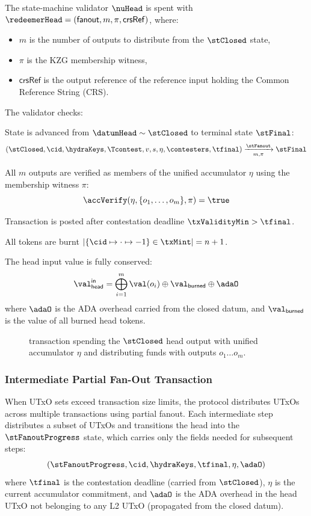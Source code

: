 \noindent The state-machine validator $\nuHead$ is spent with
$\redeemerHead = (\mathsf{fanout}, m, \pi, \mathsf{crsRef})$, where:
\begin{itemize}
  \item $m$ is the number of outputs to distribute from the $\stClosed$ state,
  \item $\pi$ is the KZG membership witness,
  \item $\mathsf{crsRef}$ is the output reference of the reference input holding the Common Reference String (CRS).
\end{itemize}
The validator checks:
\begin{menumerate}
	\item State is advanced from $\datumHead \sim \stClosed$ to terminal state $\stFinal$:
	\[
		(\stClosed,\cid,\hydraKeys,\Tcontest,v, s,\eta,\contesters,\tfinal) \xrightarrow[m,\pi]{\stFanout} \stFinal
	\]
	\item All $m$ outputs are verified as members of the unified accumulator $\eta$ using the membership witness $\pi$:
	\[
		\accVerify(\eta, \{o_1, \ldots, o_m\}, \pi) = \true
	\]
	\item Transaction is posted after contestation deadline $\txValidityMin > \tfinal$.
	\item All tokens are burnt
	$|\{\cid \mapsto \cdot \mapsto -1\} \in \txMint| = n + 1$.
	\item The head input value is fully conserved:
	\[
		\val_{\mathsf{head}}^{\mathsf{in}} = \bigoplus_{i=1}^{m} \val(o_i) \oplus \val_{\mathsf{burned}} \oplus \adaO
	\]
	where $\adaO$ is the ADA overhead carried from the closed datum, and $\val_{\mathsf{burned}}$ is the value of all burned head tokens.
\end{menumerate}

\begin{figure}[H]
	\centering
	
	\caption{\mtxFanout{} transaction spending the $\stClosed$ head output with unified accumulator $\eta$ and
		distributing funds with outputs $o_{1} \dots o_{m}$.}\label{fig:fanoutTx}
\end{figure}

\subsubsection{Intermediate Partial Fan-Out Transaction}\label{sec:partial-fanout-tx}

When UTxO sets exceed transaction size limits, the protocol distributes UTxOs across
multiple transactions using partial fanout. Each intermediate step distributes a subset of UTxOs and
transitions the head into the $\stFanoutProgress$ state, which carries only the fields needed for
subsequent steps:
\[
  (\stFanoutProgress,\cid,\hydraKeys,\tfinal,\eta,\adaO)
\]
where $\tfinal$ is the contestation deadline (carried from $\stClosed$), $\eta$ is the
current accumulator commitment, and $\adaO$ is the ADA overhead in the head UTxO not
belonging to any L2 UTxO (propagated from the closed datum).

